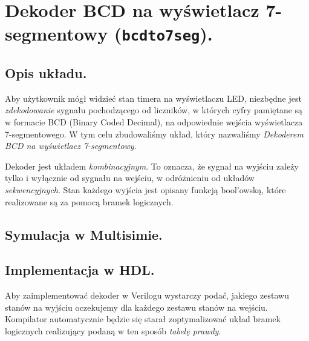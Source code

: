 \documentclass[a4paper,oneside]{report}
\newcommand{\bcdtoseg}{\texttt{bcd\textunderscore to\textunderscore 7seg}}
\begin{document}

\section{Dekoder BCD na wyświetlacz 7-segmentowy (\bcdtoseg).}
\subsection{Opis układu.}
Aby użytkownik mógł widzieć stan timera na wyświetlaczu LED,
niezbędne jest \emph{zdekodowanie} sygnału pochodzącego od
liczników, w których cyfry pamiętane są w formacie BCD (Binary
Coded Decimal), na odpowiednie wejścia wyświetlacza 7-segmentowego.
W tym celu zbudowaliśmy układ, który nazwaliśmy \emph{Dekoderem
BCD na wyświetlacz 7-segmentowy}.

Dekoder jest układem \emph{kombinacyjnym}. To oznacza, że sygnał na
wyjściu zależy tylko i wyłącznie od sygnału na wejściu, w
odróżnieniu od układów \emph{sekwencyjnych}. Stan każdego wyjścia
jest opisany funkcją bool'owską, które realizowane są za pomocą
bramek logicznych.
\subsection{Symulacja w Multisimie.}
\subsection{Implementacja w HDL.}
Aby zaimplementować dekoder w Verilogu wystarczy podać, jakiego
zestawu stanów na wyjściu oczekujemy dla każdego zestawu stanów na
wejściu. Kompilator automatycznie będzie się starał zoptymalizować
układ bramek logicznych realizujący podaną w ten sposób
\emph{tabelę prawdy}.


\end{document}
